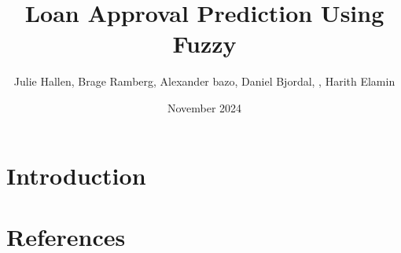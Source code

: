 \documentclass{article}
\title{Loan Approval Prediction Using Fuzzy}
\author{Julie Hallen, Brage Ramberg, Alexander bazo, Daniel Bjordal, , Harith Elamin}
\date{November 2024}
\begin{document}
\maketitle

\section{Introduction}



\section{References}

\end{document}
